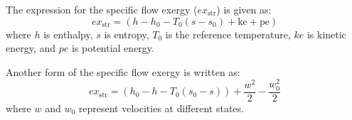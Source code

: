 The expression for the specific flow exergy (\(ex_{\text{str}}\)) is given as:  
\[
ex_{\text{str}} = (h - h_0 - T_0(s - s_0) + \text{ke} + \text{pe})
\]  
where \(h\) is enthalpy, \(s\) is entropy, \(T_0\) is the reference temperature, \(ke\) is kinetic energy, and \(pe\) is potential energy.  

Another form of the specific flow exergy is written as:  
\[
ex_{\text{str}} = (h_0 - h - T_0(s_0 - s)) + \frac{w^2}{2} - \frac{w_0^2}{2}
\]  
where \(w\) and \(w_0\) represent velocities at different states.